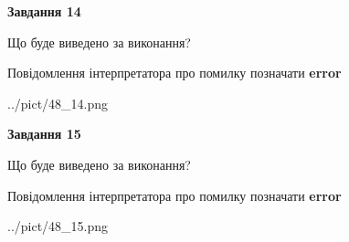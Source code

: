 \documentclass[11pt, ukrainian]{article}
\begin{document}
{\begin {large}
{\begin {center}\textbf{Завдання 14}\end {center}}\par
Що буде виведено за виконання? \par
Повідомлення інтерпретатора про помилку позначати \textbf{error}

\begin{center}
	{../pict/48_14.png}
\end{center}
\newpage

{\begin {center}\textbf{Завдання 15}\end {center}}\par
Що буде виведено за виконання? \par
Повідомлення інтерпретатора про помилку позначати \textbf{error}

\begin{center}
	{../pict/48_15.png}
\end{center}
\newpage

\end {large}}
\end{document}
